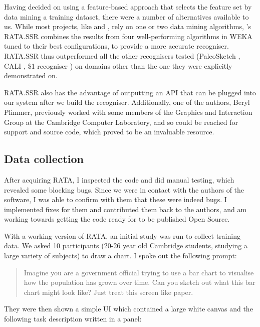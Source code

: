 	Having decided on using a feature-based approach that selects the feature set by data mining a training dataset, there were a number of alternatives available to us. While most projects, like \citep{rubine_specifying_1991} and \citep{willems_iconic_2009}, rely on one or two data mining algorithms, \citep{chang_rata._2010}'s RATA.SSR combines the results from four well-performing algorithms in WEKA \citep{hall_weka_2009} tuned to their best configurations, to provide a more accurate recogniser. RATA.SSR thus outperformed all the other recognisers tested (PaleoSketch \citep{paulson_paleosketch:_2008}, CALI \citep{fonseca_cali:_2002}, \$1 recogniser \citep{wobbrock_gestures_2007}) on domains other than the one they were explicitly demonstrated on. 
	
	RATA.SSR also has the advantage of outputting an API that can be plugged into our system after we build the recogniser. Additionally, one of the authors, Beryl Plimmer, previously worked with some members of the Graphics and Interaction Group at the Cambridge Computer Laboratory, and so could be reached for support and source code, which proved to be an invaluable resource.
	
	\subsection{Data collection}
	After acquiring RATA, I inspected the code and did manual testing, which revealed some blocking bugs. Since we were in contact with the authors of the software, I was able to confirm with them that these were indeed bugs. I implemented fixes for them and contributed them back to the authors, and am working towards getting the code ready for to be published Open Source.
	
	With a working version of RATA, an initial study was run to collect training data. We asked 10 participants (20-26 year old Cambridge students, studying a large variety of subjects) to draw a chart. I spoke out the following prompt:
	
	\begin{quotation}
	Imagine you are a government official trying to use a bar chart to visualise how the population has grown over time. Can you sketch out what this bar chart might look like? Just treat this screen like paper.
	\end{quotation}
	
	 They were then shown a simple UI which contained a large white canvas and the following task description written in a panel:
	
